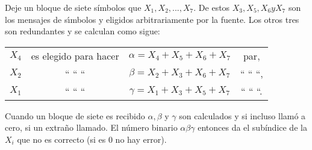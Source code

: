 
Deje un bloque de siete s\'imbolos que $X_{1}, X_{2},...,X_{7}$. De
estos $X_{3}, X_{5}, X_{6} y X_{7}$ son los mensajes de s\'{\i}mbolos
y eligidos arbitrariamente por la fuente. Los otros tres son
redundantes y se calculan como sigue:
\begin{center}
\begin{tabular}{c c c c}
$X_{4}$ & es elegido para hacer & $\alpha=X_{4}+X_{5}+X_{6}+X_{7}$ & par, \\
$X_{2}$ & `` `` `` & $\beta=X_{2}+X_{3}+X_{6}+X_{7}$ & `` `` ``, \\
$X_{1}$ & `` `` ``& $\gamma=X_{1}+X_{3}+X_{5}+X_{7}$ & `` `` ``.
\end{tabular}
\end{center}
Cuando un bloque de siete es recibido $\alpha, \beta$ y $\gamma$ son
calculados y si incluso llam\'o a cero, si un extra\~no llamado. El
n\'umero binario $\alpha \beta \gamma$ entonces da el sub\'indice de
la $X_{i}$ que no es correcto (si es 0 no hay error).

\clearpage

